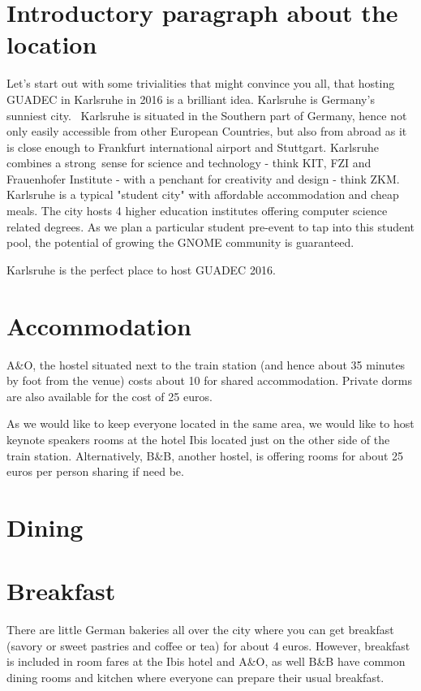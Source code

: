 \section{Introductory paragraph about the location}

Let's start out with some trivialities that might convince you all, that hosting GUADEC in Karlsruhe in 2016 is a brilliant idea. Karlsruhe is Germany's sunniest city.  Karlsruhe is situated in the Southern part of Germany, hence not only easily accessible from other European Countries, but also from abroad as it is close enough to Frankfurt international airport and Stuttgart. Karlsruhe combines a strong sense for science and technology - think KIT, FZI and Frauenhofer Institute - with a penchant for creativity and design - think ZKM. Karlsruhe is a typical "student city" with affordable accommodation and cheap meals. The city hosts 4 higher education institutes offering computer science related degrees. As we plan a particular student pre-event to tap into this student pool, the potential of growing the GNOME community is guaranteed.  

Karlsruhe is the perfect place to host GUADEC 2016. 


\section{Accommodation}

A&O, the hostel situated next to the train station (and hence about 35 minutes by foot from the venue) costs about 10 for shared accommodation. Private dorms are also available for the cost of 25 euros. 

As we would like to keep everyone located in the same area, we would like to host keynote speakers rooms at the hotel Ibis located just on the other side of the train station. 
Alternatively, B&B, another hostel, is offering rooms for about 25 euros per person sharing if need be. 


\section{Dining}

\section{Breakfast}
There are little German bakeries all over the city where you can get breakfast (savory or sweet pastries and coffee or tea) for about 4 euros. However, breakfast is included in room fares at the Ibis hotel and A&O, as well B&B have common dining rooms and kitchen where everyone can prepare their usual breakfast.
 
